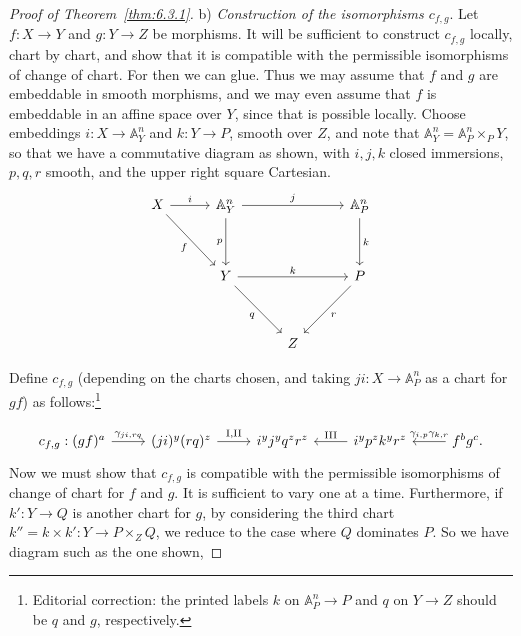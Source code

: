 \begin{proof}[Proof of Theorem~\ref{thm:6.3.1}]
\medskip{}\label{construction:6.3.b}\noindent b) \textit{Construction of the isomorphisms $c_{f,g}$}. Let $f\colon X\to Y$ and $g\colon Y\to Z$ be morphisms. It will be sufficient to construct $c_{f,g}$ locally, chart by chart, and show that it is compatible with the permissible isomorphisms of change of chart. For then we can glue. Thus we may assume that $f$ and $g$ are embeddable in smooth morphisms, and we may even assume that $f$ is embeddable in an affine space over $Y$, since that is possible locally. Choose embeddings
$i: X \longrightarrow \mathbb{A}^n_Y$ and $k: Y \longrightarrow P$, smooth
over $Z$, and note that $\mathbb{A}^n_Y = \mathbb{A}^n_P \times_P Y$, so
that we have a commutative diagram as
shown, with $i, j, k$ closed immersions, $p, q, r$ smooth, and the upper right square Cartesian.
\[
\begin{tikzcd}[row sep=1.2cm, column sep=1cm]
	X \arrow[r, "i"] \arrow[dr, "f"'] & \mathbb{A}^n_Y \arrow[rr, "j"] \arrow[d, "p"'] & & \mathbb{A}^n_P \arrow[d, "k"] \\
	& Y \arrow[rr, "k"] \arrow[dr, "q"'] & & P \arrow[dl, "r"] \\
	& & Z &
\end{tikzcd}
\]

Define $c_{f,g}$ (depending on the charts chosen, and taking $ji: X \longrightarrow \mathbb{A}^n_P$ as a chart for $gf$) as follows:\footnote{Editorial correction: the printed labels $k$ on $\mathbb{A}^n_P\to P$ and $q$ on $Y\to Z$ should be $q$ and $g$, respectively.}

\[
\begin{tikzcd}
	c_{f,g}: (gf)^a \arrow[r, "\gamma_{ji,rq}"] & (ji)^y(rq)^z \arrow[r,"\mathrm{I,II}"] & i^y j^y q^z r^z & i^y p^z k^y r^z \arrow[l, "\mathrm{III}"'] & f^b g^c. \arrow[l, "\gamma_{i,p} \gamma_{k,r}"']
\end{tikzcd}
\]
Now we must show that $c_{f,g}$ is compatible with the permissible isomorphisms of change of chart for $f$ and $g$. It is sufficient to vary one at a time. Furthermore, if $k'\colon Y\to Q$ is another chart for $g$, by considering the third chart $k'' = k\times k'\colon Y\to P\times_Z Q$, we reduce to the case where $Q$ dominates $P$. So we have diagram such as the one shown,


\end{proof}

